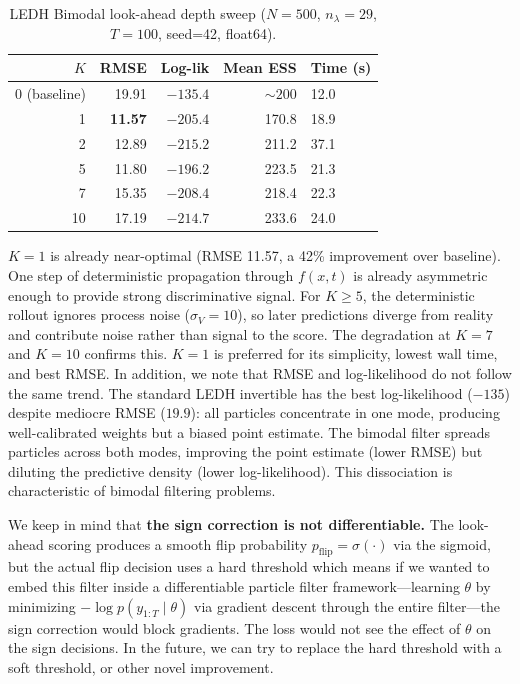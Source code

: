 \documentclass{article}
\begin{document}
\begin{table}[H]
\centering
\begin{tabular}{rrrrl}
\toprule
$K$ & RMSE & Log-lik & Mean ESS & Time (s) \\
\midrule
0 (baseline) & 19.91 & $-135.4$ & $\sim\!200$ & 12.0 \\
1 & \textbf{11.57} & $-205.4$ & 170.8 & 18.9 \\
2 & 12.89 & $-215.2$ & 211.2 & 37.1 \\
5 & 11.80 & $-196.2$ & 223.5 & 21.3 \\
7 & 15.35 & $-208.4$ & 218.4 & 22.3 \\
10 & 17.19 & $-214.7$ & 233.6 & 24.0 \\
\bottomrule
\end{tabular}
\caption{LEDH Bimodal look-ahead depth sweep ($N=500$, $n_\lambda=29$, $T=100$, seed=42, float64).}
\label{tab:kitagawa_ksweep}
\end{table}

$K=1$ is already near-optimal (RMSE 11.57, a 42\% improvement over baseline). One step of deterministic propagation through $f(x,t)$ is already asymmetric enough to provide strong discriminative signal. For $K \geq 5$, the deterministic rollout ignores process noise ($\sigma_V = 10$), so later predictions diverge from reality and contribute noise rather than signal to the score. The degradation at $K = 7$ and $K = 10$ confirms this. $K = 1$ is preferred for its simplicity, lowest wall time, and best RMSE. In addition, we note that RMSE and log-likelihood do not follow the same trend. The standard LEDH invertible has the best log-likelihood ($-135$) despite mediocre RMSE ($19.9$): all particles concentrate in one mode, producing well-calibrated weights but a biased point estimate. The bimodal filter spreads particles across both modes, improving the point estimate (lower RMSE) but diluting the predictive density (lower log-likelihood). This dissociation is characteristic of bimodal filtering problems.


We keep in mind that  \textbf{the sign correction is not differentiable.}
The look-ahead scoring produces a smooth flip probability $p_{\text{flip}} = \sigma(\cdot)$ via the sigmoid, but the actual flip decision uses a hard threshold which means if we wanted to embed this filter inside a differentiable particle filter framework---learning $\theta$ by minimizing $-\log p(y_{1:T} \mid \theta)$ via gradient descent through the entire filter---the sign correction would block gradients. The loss would not see the effect of $\theta$ on the sign decisions. In the future, we can try to replace the hard threshold with a soft threshold, or other novel improvement. 
\end{document}
